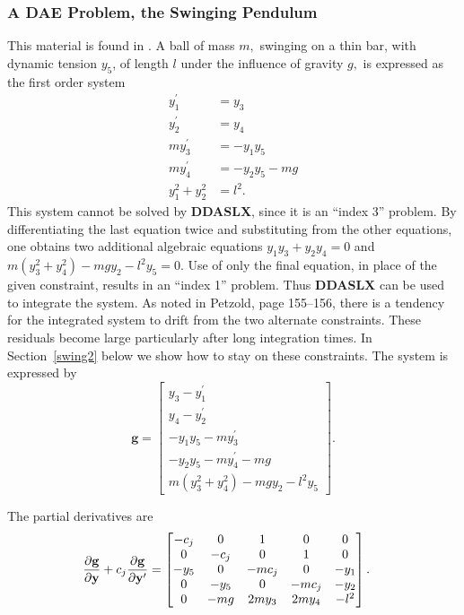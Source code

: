 \documentclass[twoside]{MATH77}
\begin{document}
\subsubsection{A DAE Problem, the Swinging Pendulum\label{swing1}}
This material is found in \cite[p. 154]{Brenan:1996:DAE}.  A ball of mass
$m,$ swinging on a thin bar, with dynamic tension $y_{5}$, of length $l$ under
the influence of gravity $g,$ is expressed as the first order system
\begin{align*}
  y_{1}^{\prime}&=y_{3}\\
  y_{2}^{\prime}&=y_{4}\\
  m y_{3}^{\prime}&=-y_{1}y_{5}\\
  m y_{4}^{\prime}&=-y_{2}y_{5}-mg\\
  y_{1}^{2}+y_{2}^{2}&=l^{2}.
\end{align*}
This system cannot be solved by \textbf{DDASLX}, since it is
an ``index 3'' problem.  By differentiating the last equation twice and
substituting from the other equations, one obtains two additional algebraic
equations $y_{1}y_{3}+y_{2}y_{4}=0$ and $m(y_{3}^{2}+y_{4}^{2})%
-mgy_{2}-l^{2}y_{5}=0$.  Use of only the final equation, in place of the given
constraint, results in an ``index 1'' problem.  Thus \textbf{DDASLX} can be
used to integrate the system.  As noted in Petzold, page 155--156, there is a
tendency for the integrated system to drift from the two
alternate constraints.  These residuals become large particularly after long
integration times.  In Section~\ref{swing2} below we show how to stay on these
constraints.  The system is expressed by
\begin{equation*}
  \mathbf{g}=
  \begin{bmatrix}
    y_{3}-y_{1}^{\prime}\\
    y_{4}-y_{2}^{\prime}\\
    -y_{1}y_{5}-my_{3}^{\prime}\\
    -y_{2}y_{5}-my_{4}^{\prime}-mg\\
    m( y_{3}^{2}+y_{4}^{2})  -mgy_{2}-l^{2}y_{5}
  \end{bmatrix}.
\end{equation*}

The partial derivatives are
\begin{equation*}\hspace{-10pt}
  \frac{\partial \mathbf{g}}{\partial \mathbf{y}}+c_{j}\frac{\partial
    \mathbf{g}}{\partial \mathbf{y}^{\prime}} =
  \begin{bmatrix}
    -c_{j} & 0 & 1 & 0 & 0\\
    0 & -c_{j} & 0 & 1 & 0\\
    -y_{5} & 0 & -mc_{j} & 0 & -y_{1}\\
    0 & -y_{5} & 0 & -mc_{j} & -y_{2}\\
    0 & -mg & 2my_{3} & 2my_{4} & -l^{2}
  \end{bmatrix}.
\end{equation*}
\end{document}

